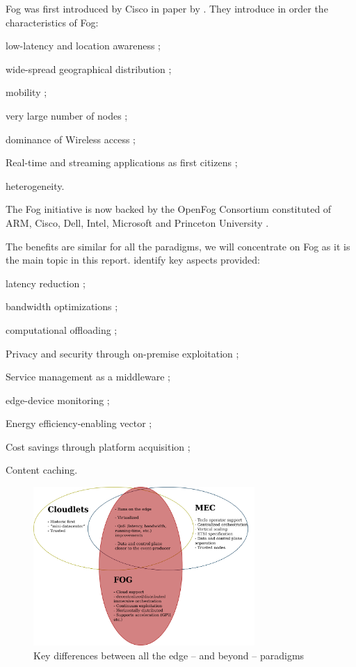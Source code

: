\documentclass[11pt]{sdm}
\begin{document}
\begin{description}
	Fog was first introduced by Cisco in  paper by . They introduce in order the characteristics of Fog:
	\begin{enumerate*}[(i)]
		\item low-latency and location awareness ;
		\item wide-spread geographical distribution ;
		\item mobility ;
		\item very large number of nodes ;
		\item dominance of Wireless access ;
		\item Real-time and streaming applications as first citizens ;
		\item heterogeneity.
	\end{enumerate*}
	The Fog initiative is now backed by the OpenFog Consortium \cite{ieee_standards_association_ieee_2018} constituted of ARM, Cisco, Dell, Intel, Microsoft and Princeton University \cite{chiang_fog_2016}.
\end{description}

The benefits are similar for all the paradigms, we will concentrate on Fog as it is the main topic in this report. \citet{ahmed_fog_2019, ai_edge_2018} identify key aspects provided:
\begin{enumerate*}[(1)]
	\item latency reduction ;
	\item bandwidth optimizations ;
	\item computational offloading ;
	\item Privacy and security through on-premise exploitation ;
	\item Service management as a middleware ;
	\item edge-device monitoring ;
	\item Energy efficiency-enabling vector ;
	\item Cost savings through platform acquisition ;
	\item Content caching.
\end{enumerate*}

\begin{figure}[t]
	\centering
	\includegraphics[width=0.75\textwidth]{./assets/CloudLetsVMECvFog.drawio.png}
	\caption{Key differences between all the edge -- and beyond -- paradigms}
	\label{fig:fogVall}
\end{figure}
\end{document}
